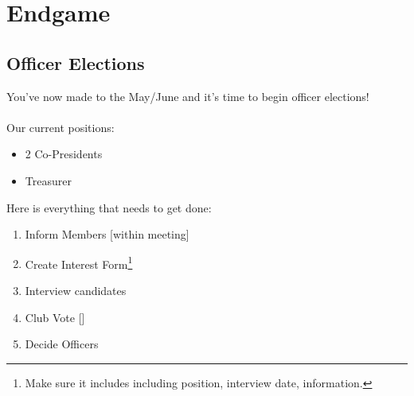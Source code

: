 \chapter{Endgame}


\section{Officer Elections}
\label{sec:Officer}

You've now made to the May/June and it's time to begin officer elections! \\\\

\noindent
Our current positions:
\begin{itemize}
    \item 2 Co-Presidents
    \item Treasurer
\end{itemize}

\noindent
Here is everything that needs to get done:
\begin{enumerate}
    \item Inform Members [within meeting]
    \item Create Interest Form\footnote[1]{Make sure it includes including position, interview date, information.}
    \item Interview candidates
    \item Club Vote []
    \item Decide Officers
\end{enumerate}








